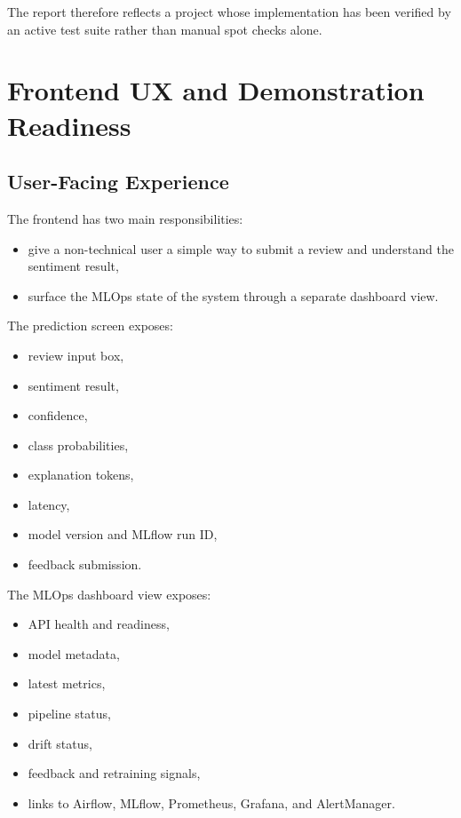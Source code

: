 \documentclass[11pt,a4paper]{article}
\begin{document}
The report therefore reflects a project whose implementation has been verified by an active test suite rather than manual spot checks alone.

\section{Frontend UX and Demonstration Readiness}

\subsection{User-Facing Experience}

The frontend has two main responsibilities:

\begin{itemize}[leftmargin=1.4em]
  \item give a non-technical user a simple way to submit a review and understand the sentiment result,
  \item surface the MLOps state of the system through a separate dashboard view.
\end{itemize}

The prediction screen exposes:

\begin{itemize}[leftmargin=1.4em]
  \item review input box,
  \item sentiment result,
  \item confidence,
  \item class probabilities,
  \item explanation tokens,
  \item latency,
  \item model version and MLflow run ID,
  \item feedback submission.
\end{itemize}

The MLOps dashboard view exposes:

\begin{itemize}[leftmargin=1.4em]
  \item API health and readiness,
  \item model metadata,
  \item latest metrics,
  \item pipeline status,
  \item drift status,
  \item feedback and retraining signals,
  \item links to Airflow, MLflow, Prometheus, Grafana, and AlertManager.
\end{itemize}
\end{document}
